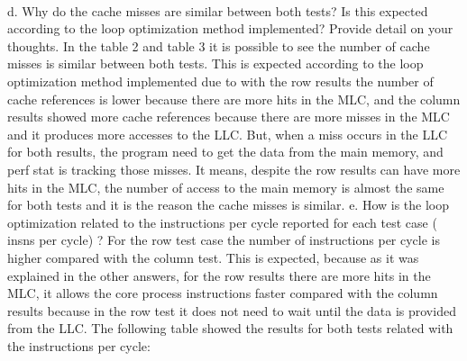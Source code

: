 \documentclass[xcolor=table]{llncs}
\begin{document}
\paragraph{}
d. Why do the cache misses are similar between both tests? Is this expected according to the loop optimization method implemented? Provide detail on your thoughts.\newline
In the table 2 and table 3 it is possible to see the number of cache misses is similar between both tests. This is expected according to the loop optimization method implemented due to with the row results the number of cache references is lower because there are more hits in the MLC, and the column results showed more cache references because there are more misses in the MLC and it produces more accesses to the LLC. But, when a miss occurs in the LLC for both results, the program need to get the data from the main memory, and perf stat is tracking those misses. It means, despite the row results can have more hits in the MLC, the number of access to the main memory is almost the same for both tests and it is the reason the cache misses is similar.\newline
e. How is the loop optimization related to the instructions per cycle reported for each test case ( insns per cycle) ?\newline
For the row test case the number of instructions per cycle is higher compared with the column test. This is expected, because as it was explained in the other answers, for the row results there are more hits in the MLC, it allows the core process instructions faster compared with the column results because in the row test it does not need to wait until the data is provided from the LLC.
The following table showed the results for both tests related with the instructions per cycle:
\end{document}
